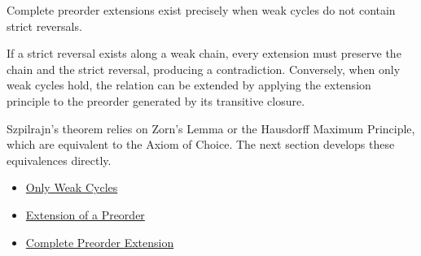 \begin{remark*}[Interpretation]
Complete preorder extensions exist precisely when weak cycles do not contain
strict reversals.
\end{remark*}

\begin{remark*}[Exposition]
If a strict reversal exists along a weak chain, every extension must preserve
the chain and the strict reversal, producing a contradiction. Conversely, when
only weak cycles hold, the relation can be extended by applying the extension
principle to the preorder generated by its transitive closure.
\end{remark*}

\begin{remark*}[Exposition]
Szpilrajn's theorem relies on Zorn's Lemma or the Hausdorff Maximum Principle,
which are equivalent to the Axiom of Choice. The next section develops these
equivalences directly.
\end{remark*}

\begin{dependencies}
\begin{itemize}
  \item \hyperref[def:owc]{Only Weak Cycles}
  \item \hyperref[def:preorder-extension]{Extension of a Preorder}
  \item \hyperref[cor:complete-preorder-extension]{Complete Preorder Extension}
\end{itemize}
\end{dependencies}
